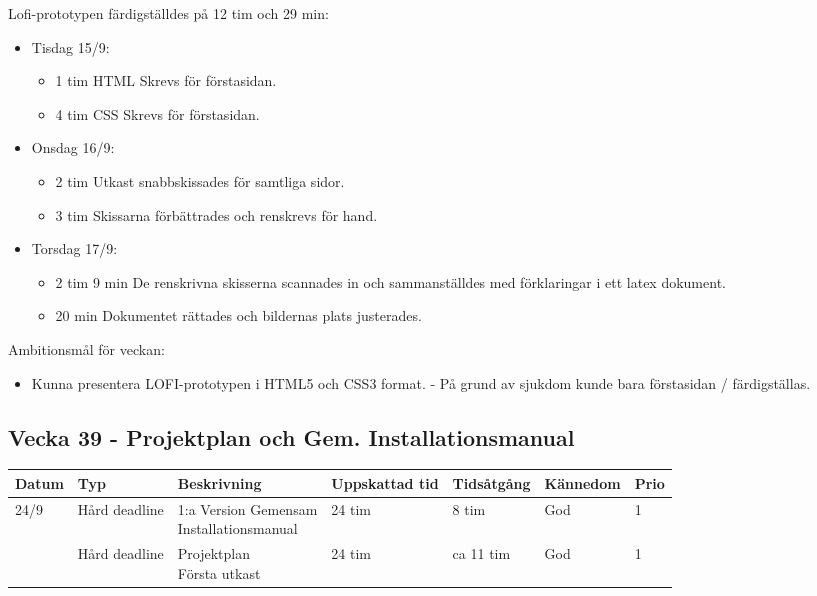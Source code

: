 \documentclass{TDP003mall}
\begin{document}
Lofi-prototypen färdigställdes på 12 tim och 29 min:
\begin{itemize}
	\item Tisdag 15/9:
	\begin{itemize}
		\item 1 tim HTML Skrevs för förstasidan.
		\item 4 tim CSS Skrevs för förstasidan.
	\end{itemize}
	\item Onsdag 16/9:
	\begin{itemize}
		\item 2 tim Utkast snabbskissades för samtliga sidor.
		\item 3 tim Skissarna förbättrades och renskrevs för hand.
	\end{itemize}
	\item Torsdag 17/9:
	\begin{itemize}
		\item 2 tim 9 min De renskrivna skisserna scannades in och sammanställdes med förklaringar i ett latex dokument.
		\item 20 min Dokumentet rättades och bildernas plats justerades.
	\end{itemize}
\end{itemize}


Ambitionsmål för veckan:
\begin{itemize}
  \item Kunna presentera LOFI-prototypen i HTML5 och CSS3 format. - På grund av sjukdom kunde bara förstasidan / färdigställas.
  \end{itemize}
  
\newpage


  
\subsection*{Vecka 39 - Projektplan och Gem. Installationsmanual}
\begin{tabularx}{\linewidth}{|l|l|X|l|l|l|l|}
	\hline
	Datum & Typ           & Beskrivning                        & Uppskattad tid & Tidsåtgång     & Kännedom & Prio \\ [0.5ex]
	\hline                                     
	24/9  & Hård deadline & \makecell[tl]{1:a Version Gemensam\\Installationsmanual} & 24 tim            & 8 tim    & God      & 1    \\
	\hline                                     
          & Hård deadline & \makecell[tl]{Projektplan\\Första utkast}         & 24 tim            & ca 11 tim & God      & 1    \\
	\hline
\end{tabularx}
\end{document}
